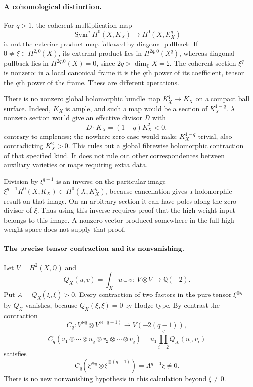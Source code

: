 \documentclass[11pt]{article}
\newcommand{\Q}{\mathbb Q}\newcommand{\C}{\mathbb C}\newcommand{\Z}{\mathbb Z}\newcommand{\R}{\mathbb R}\newcommand{\A}{\mathbb A}\newcommand{\OO}{\mathcal O}
\theoremstyle{definition}\newtheorem{definition}[theorem]{Definition}\newtheorem{remark}[theorem]{Remark}
\begin{document}
\paragraph{A cohomological distinction.}
For $q>1$, the coherent multiplication map
\[
 \operatorname{Sym}^q H^0(X,K_X)\longrightarrow H^0(X,K_X^q)
\]
is not the exterior-product map followed by diagonal pullback. If
$0\ne\xi\in H^{2,0}(X)$, its external product lies in
$H^{2q,0}(X^q)$, whereas diagonal pullback lies in
$H^{2q,0}(X)=0$, since $2q>\dim_\C X=2$.
The coherent section $\xi^q$ is nonzero: in a local canonical frame it is the $q$th power of its coefficient, tensor the $q$th power of the frame. These are different operations.

There is no nonzero global holomorphic bundle map $K_X^q\to K_X$ on a compact ball surface. Indeed, $K_X$ is ample, and such a map would be a section of $K_X^{1-q}$. A nonzero section would give an effective divisor $D$ with
\[
 D\cdot K_X=(1-q)K_X^2<0,
\]
contrary to ampleness; the nowhere-zero case would make $K_X^{1-q}$ trivial, also contradicting $K_X^2>0$. This rules out a global fibrewise holomorphic contraction of that specified kind. It does not rule out other correspondences between auxiliary varieties or maps requiring extra data.

Division by $\xi^{q-1}$ is an inverse on the particular image
$\xi^{q-1}H^0(X,K_X)\subset H^0(X,K_X^q)$, because cancellation gives a holomorphic result on that image. On an arbitrary section it can have poles along the zero divisor of $\xi$. Thus using this inverse requires proof that the high-weight input belongs to this image. A nonzero vector produced somewhere in the full high-weight space does not supply that proof.

\paragraph{The precise tensor contraction and its nonvanishing.}
Let $V=H^2(X,\Q)$ and
\[
 Q_X(u,v)=\int_Xu\smile v:\ V\otimes V\longrightarrow\Q(-2).
\]
Put $A=Q_X(\xi,\overline\xi)>0$. Every contraction of two factors in the pure tensor $\xi^{\otimes q}$ by $Q_X$ vanishes, because $Q_X(\xi,\xi)=0$ by Hodge type. By contrast the contraction
\[
 C_q:V^{\otimes q}\otimes V^{\otimes(q-1)}
       \longrightarrow V(-2(q-1)),
\]
\[
 C_q(u_1\otimes\cdots\otimes u_q\otimes v_2\otimes\cdots\otimes v_q)
       =u_1\prod_{i=2}^q Q_X(u_i,v_i)
\]
satisfies
\[
 C_q(\xi^{\otimes q}\otimes\overline\xi^{\otimes(q-1)})
           =A^{q-1}\xi\ne0.
 \tag{B14a}
\]
There is no new nonvanishing hypothesis in this calculation beyond $\xi\ne0$.
\end{document}
